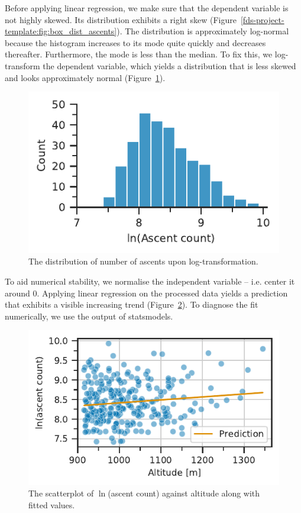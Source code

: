 \documentclass[11pt,a4paper]{article}
\begin{document}
Before applying linear regression, we make sure that the dependent variable is not highly skewed. Its distribution exhibits a right skew (Figure~\ref{fds-project-template:fig:box_dist_ascents}). The distribution is approximately log-normal because the histogram increases to its mode quite quickly and decreases thereafter. Furthermore, the mode is less than the median. To fix this, we log-transform the dependent variable, which yields a distribution that is less skewed and looks approximately normal (Figure~\ref{fds-project-template:fig:dist_log_ascent_count}).
\begin{figure} [h!]
  \centering
  \includegraphics{report/ascent_count_distribution.pdf}
  \caption{The distribution of number of ascents upon log-transformation.}
  \label{fds-project-template:fig:dist_log_ascent_count}
\end{figure}

To aid numerical stability, we normalise the independent variable – i.e. center it around 0. Applying linear regression on the processed data yields a prediction that exhibits a visible increasing trend (Figure~\ref{fds-project-template:fig:q1_prediction}). To diagnose the fit numerically, we use the output of statsmodels.
\begin{figure} [h!]
  \centering
  \includegraphics{report/q1_prediction.pdf}
  \caption{The scatterplot of $\ln$(ascent count) against altitude along with fitted values.}
  \label{fds-project-template:fig:q1_prediction}
\end{figure}
\end{document}
